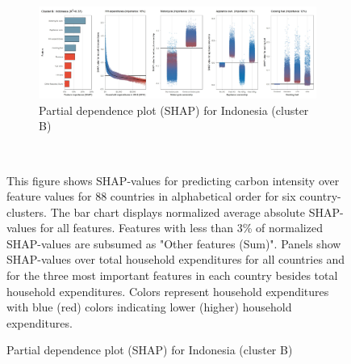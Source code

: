 \begin{figure}[ht!]
    \\
    \vspace{0.5cm}
   \begin{subfigure}[b]{\textwidth}
   \centering
         \caption{Partial dependence plot (SHAP) for Indonesia (cluster B)}
         \label{fig:5b_IDN}
         \includegraphics[width=\textwidth]{Figure 5b/Figure_5b_IDN}
     \end{subfigure}
    \\
    \vspace{0.5cm}
  
    \begin{subcaption2}
     This figure shows SHAP-values for predicting carbon intensity over feature values for 88 countries in alphabetical order for six country-clusters. The bar chart displays normalized average absolute SHAP-values for all features. Features with less than 3\% of normalized SHAP-values are subsumed as "Other features (Sum)". Panels show SHAP-values over total household expenditures for all countries and for the three most important features in each country besides total household expenditures. Colors represent household expenditures with blue (red) colors indicating lower (higher) household expenditures.
     \end{subcaption2}
\end{figure}

